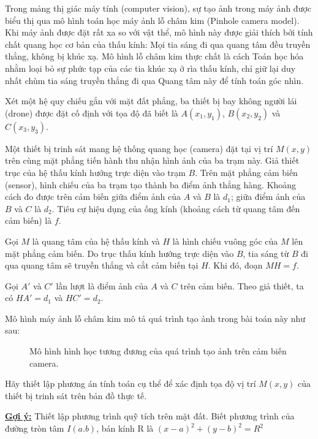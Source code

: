 
Trong mảng thị giác máy tính (computer vision), sự tạo ảnh trong máy ảnh được biểu thị qua mô hình toán học máy ảnh lỗ châm kim (Pinhole camera model). Khi máy ảnh được đặt rất xa so với vật thể, mô hình này được giải thích bởi tính chất quang học cơ bản của thấu kính: Mọi tia sáng đi qua quang tâm đều truyền thẳng, không bị khúc xạ. Mô hình lỗ châm kim thực chất là cách Toán học hóa nhằm loại bỏ sự phức tạp của các tia khúc xạ ở rìa thấu kính, chỉ giữ lại duy nhất chùm tia sáng truyền thẳng đi qua Quang tâm này để tính toán góc nhìn.

Xét một hệ quy chiếu gắn với mặt đất phẳng, ba thiết bị bay không người lái (drone) được đặt cố định với tọa độ đã biết là $A\left( x_1, y_1 \right)$, $B\left( x_2, y_2 \right)$ và $C\left( x_3, y_3 \right)$. 

Một thiết bị trinh sát mang hệ thống quang học (camera) đặt tại vị trí $M\left( x, y \right)$ trên cùng mặt phẳng tiến hành thu nhận hình ảnh của ba trạm này. Giả thiết trục của hệ thấu kính hướng trực diện vào trạm $B$. Trên mặt phẳng cảm biến (sensor), hình chiếu của ba trạm tạo thành ba điểm ảnh thẳng hàng. Khoảng cách đo được trên cảm biến giữa điểm ảnh của $A$ và $B$ là $d_1$; giữa điểm ảnh của $B$ và $C$ là $d_2$. Tiêu cự hiệu dụng của ống kính (khoảng cách từ quang tâm đến cảm biến) là $f$. 

Gọi $M$ là quang tâm của hệ thấu kính và $H$ là hình chiếu vuông góc của $M$ lên mặt phẳng cảm biến. Do trục thấu kính hướng trực diện vào $B$, tia sáng từ $B$ đi qua quang tâm sẽ truyền thẳng và cắt cảm biến tại $H$. Khi đó, đoạn $MH = f$.

Gọi $A'$ và $C'$ lần lượt là điểm ảnh của $A$ và $C$ trên cảm biến. Theo giả thiết, ta có $HA' = d_1$ và $HC' = d_2$.

Mô hình máy ảnh lỗ châm kim mô tả quá trình tạo ảnh trong bài toán này như sau:

\begin{figure}[!ht]
\centering

\caption{Mô hình hình học tương đương của quá trình tạo ảnh trên cảm biến camera.}
\end{figure}

Hãy thiết lập phương án tính toán cụ thể để xác định tọa độ vị trí $M\left( x, y \right)$ của thiết bị trinh sát trên bản đồ thực tế.

\underline{\textbf{Gợi ý:}} Thiết lập phương trình quỹ tích trên mặt đất. Biết phương trình của đường tròn tâm $I(a.b)$, bán kính R là $(x-a)^2+(y-b)^2=R^2$
